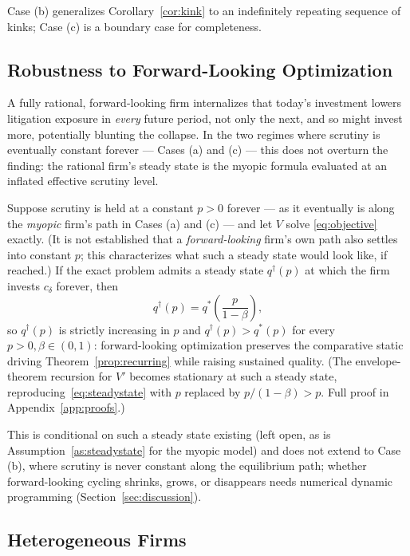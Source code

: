 Case (b) generalizes Corollary~\ref{cor:kink} to an indefinitely repeating sequence of kinks; Case (c) is a boundary case for completeness.

\subsection{Robustness to Forward-Looking Optimization}
\label{sec:forwardlooking}

A fully rational, forward-looking firm internalizes that today's investment lowers litigation exposure in \emph{every} future period, not only the next, and so might invest more, potentially blunting the collapse. In the two regimes where scrutiny is eventually constant forever — Cases (a) and (c) — this does not overturn the finding: the rational firm's steady state is the myopic formula evaluated at an inflated effective scrutiny level.

\begin{proposition}
\label{prop:forwardlooking}
Suppose scrutiny is held at a constant $p>0$ forever — as it eventually is along the \emph{myopic} firm's path in Cases (a) and (c) — and let $V$ solve \eqref{eq:objective} exactly. (It is not established that a \emph{forward-looking} firm's own path also settles into constant $p$; this characterizes what such a steady state would look like, if reached.) If the exact problem admits a steady state $q^{\dagger}(p)$ at which the firm invests $c_\delta$ forever, then
\[
q^{\dagger}(p) = q^*\!\left(\frac{p}{1-\beta}\right),
\]
so $q^{\dagger}(p)$ is strictly increasing in $p$ and $q^{\dagger}(p) > q^*(p)$ for every $p>0,\beta\in(0,1)$: forward-looking optimization preserves the comparative static driving Theorem~\ref{prop:recurring} while raising sustained quality. (The envelope-theorem recursion for $V'$ becomes stationary at such a steady state, reproducing~\eqref{eq:steadystate} with $p$ replaced by $p/(1-\beta)>p$. Full proof in Appendix~\ref{app:proofs}.)
\end{proposition}

This is conditional on such a steady state existing (left open, as is Assumption~\ref{as:steadystate} for the myopic model) and does not extend to Case (b), where scrutiny is never constant along the equilibrium path; whether forward-looking cycling shrinks, grows, or disappears needs numerical dynamic programming (Section~\ref{sec:discussion}).

\subsection{Heterogeneous Firms}
\label{sec:heterogeneous}

